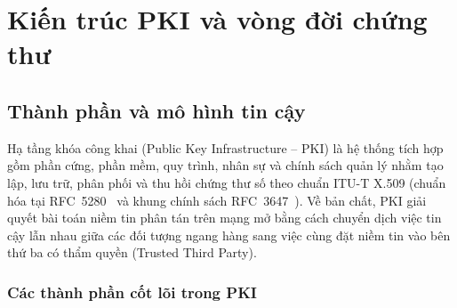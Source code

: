 \chapter{Kiến trúc PKI và vòng đời chứng thư}
\label{chap:kien-truc-pki}
\section{Thành phần và mô hình tin cậy}
\label{sec:pki-components-trust-model}

Hạ tầng khóa công khai (Public Key Infrastructure -- PKI) là hệ thống tích hợp gồm phần cứng, phần mềm, quy trình, nhân sự và chính sách quản lý nhằm tạo lập, lưu trữ, phân phối và thu hồi chứng thư số theo chuẩn ITU-T X.509 (chuẩn hóa tại RFC~5280~\cite{rfc5280} và khung chính sách RFC~3647~\cite{rfc3647}). Về bản chất, PKI giải quyết bài toán niềm tin phân tán trên mạng mở bằng cách chuyển dịch việc tin cậy lẫn nhau giữa các đối tượng ngang hàng sang việc cùng đặt niềm tin vào bên thứ ba có thẩm quyền (Trusted Third Party).

\subsection{Các thành phần cốt lõi trong PKI}
\label{subsec:pki-core-components}

